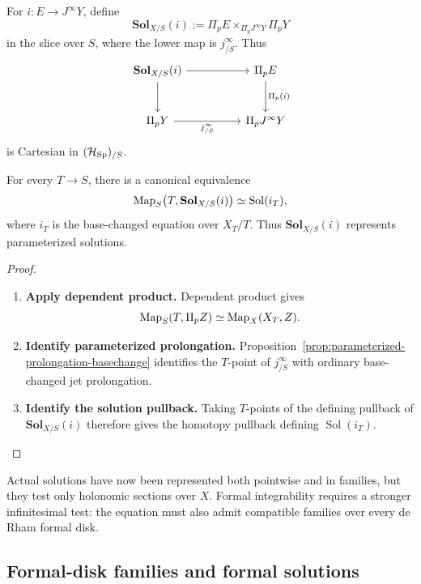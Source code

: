 \begin{definition}
For \(i:E\to J^\infty Y\), define
\[
  \mathbf{Sol}_{X/S}(i)
  :=
  \Pi_pE
  \times_{\Pi_pJ^\infty Y}
  \Pi_pY
\]
in the slice over \(S\), where the lower map is \(j^\infty_{/S}\).
Thus
\[
\begin{tikzcd}[column sep=huge,row sep=large]
\mathbf{Sol}_{X/S}(i)
  \ar[r]
  \ar[d]
&
\Pi_pE \ar[d,"\Pi_p(i)"]\\
\Pi_pY
  \ar[r,"j^\infty_{/S}"']
&
\Pi_pJ^\infty Y
\end{tikzcd}
\]
is Cartesian in \((\mathcal H_{\operatorname{Sp}})_{/S}\).
\end{definition}

\begin{theorem}
\label{thm:parameterized-solutions}
For every \(T\to S\), there is a canonical equivalence
\[
  \operatorname{Map}_S\bigl(T,\mathbf{Sol}_{X/S}(i)\bigr)
  \simeq
  \operatorname{Sol}(i_T),
\]
where \(i_T\) is the base-changed equation over \(X_T/T\). Thus
\(\mathbf{Sol}_{X/S}(i)\) represents parameterized solutions.
\end{theorem}

\begin{proof}
\leavevmode
\begin{enumerate}[label=\textup{(\arabic*)}]
    \item \textbf{Apply dependent product.}
Dependent product gives
\[
  \operatorname{Map}_S(T,\Pi_pZ)
  \simeq
  \operatorname{Map}_X(X_T,Z).
\]

    \item \textbf{Identify parameterized prolongation.}
Proposition~\ref{prop:parameterized-prolongation-basechange} identifies the
\(T\)-point of \(j^\infty_{/S}\) with ordinary base-changed jet prolongation.

    \item \textbf{Identify the solution pullback.}
Taking \(T\)-points of the defining pullback of
\(\mathbf{Sol}_{X/S}(i)\) therefore gives the homotopy pullback defining
\(\operatorname{Sol}(i_T)\).
\end{enumerate}
\end{proof}

Actual solutions have now been represented both pointwise and in families, but
they test only holonomic sections over \(X\). Formal integrability requires a
stronger infinitesimal test: the equation must also admit compatible families
over every de Rham formal disk.

\subsection{Formal-disk families and formal solutions}
\label{sec:formal-solutions}

